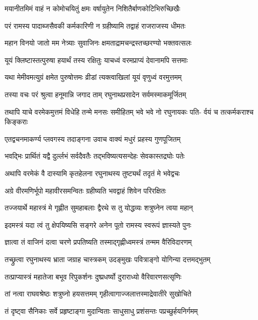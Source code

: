 \twolineshloka
{मयानीतमिमं वाहं न कोमोचयितुं क्षमः}
{वर्षायुतेन निशितैर्बाणकोटिभिरुच्छिखैः}%

\twolineshloka
{परं रामस्य पादाब्जसैवकी कर्मकारिणी}
{न ग्रहीष्यामि तद्वाहं राजराजस्य धीमतः}%

\twolineshloka
{महान विनयो जातो मम नेत्र्याः सुवाजिनः}
{क्षमताद्रामचन्द्रस्तच्छरण्यो भक्तवत्सलः}%

\twolineshloka
{यूयं क्लिष्टास्तत्पुरुषा हयार्थं तस्य रक्षितुः}
{याचध्वं वरमप्राप्यं देवानामपि सत्तमाः}%

\twolineshloka
{यथा मेमीवमत्युग्रं क्षमेत पुरुषोत्तमः}
{व्रीडां त्यक्त्वाखिलां यूयं वृणुध्वं वरमुत्तमम्}%

\twolineshloka
{तस्या वचः परं श्रुत्वा हनूमान्नि जगाद ताम्}
{रघुनाथप्रसादेन सर्वमस्माकमूर्जितम्}%

\fourlineindentedshloka
{तथापि याचे वरमेकमुत्तमं}
{विधेहि तन्मे मनसः समीहितम्}
{भवे भवे नो रघुनायकः पति-}
{र्वयं च तत्कर्मकराश्च किङ्कराः}%

\twolineshloka
{एतद्वचनमाकर्ण्य प्लवगस्य तदाङ्गना}
{उवाच वाक्यं मधुरं प्रहस्य गुणपूजितम्}%

\twolineshloka
{भवद्भिः प्रार्थितं यद्वै दुर्ल्लभं सर्वदैवतैः}
{तद्भविष्यत्यसन्देहः सेवकास्तद्रघोः पतेः}%

\twolineshloka
{अथापि वरमेकं वै दास्यामि कृतहेलना}
{रघुनाथस्य तुष्ट्यर्थं तदृतं मे भवेद्वचः}%

\twolineshloka
{अग्रे वीरमणिर्भूपो महावीरसमन्वितः}
{ग्रहीष्यति भवद्वाहं शिवेन परिरक्षितः}%

\twolineshloka
{तज्जयार्थे महास्त्रं मे गृह्णीत सुमहाबलाः}
{द्वैरथे स तु योद्धव्यः शत्रुघ्नेन त्वया महान्}%

\twolineshloka
{इदमस्त्रं यदा त्वं तु क्षेपयिष्यसि सङ्गरे}
{अनेन पूतो रामस्य स्वरूपं ज्ञास्यते पुनः}%

\twolineshloka
{ज्ञात्वा तं वाजिनं दत्वा चरणे प्रपतिष्यति}
{तस्माद्गृह्णीध्वमस्त्रं तन्मम वैरिविदारणम्}%

\twolineshloka
{तच्छ्रुत्वा रघुनाथस्य भ्राता जग्राह चास्त्रकम्}
{उदङ्मुखः पवित्राङ्गो योगिन्या दत्तमद्भुतम्}%

\twolineshloka
{तत्प्राप्यास्त्रं महातेजा बभूव रिपुकर्शनः}
{दुष्प्रधर्ष्यो दुराराध्यो वैरिवारणसत्सृणिः}%

\twolineshloka
{तां नत्वा राघवश्रेष्ठः शत्रुघ्नो हयसत्तमम्}
{गृहीत्वागाज्जलात्तस्माद्रेवातीरे सुखोचिते}%

\twolineshloka
{तं दृष्ट्वा सैनिकाः सर्वे प्रहृष्टाङ्गा मुदान्विताः}
{साधुसाधु प्रशंसन्तः पप्रच्छुर्हयनिर्गमम्}%

